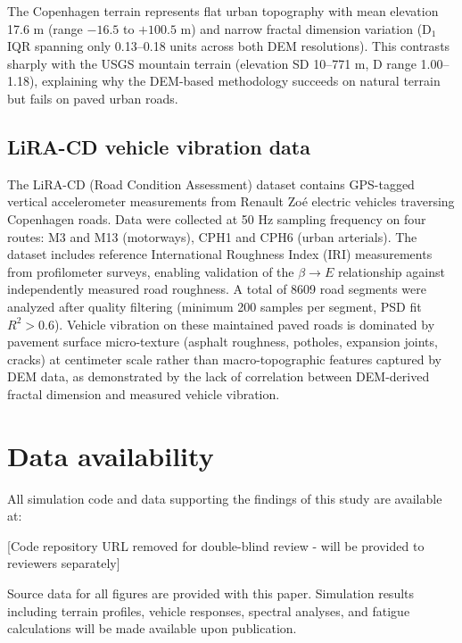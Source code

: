 \documentclass[11pt]{article}
\begin{document}
The Copenhagen terrain represents flat urban topography with mean elevation 17.6 m (range $-16.5$ to $+100.5$ m) and narrow fractal dimension variation (D$_1$ IQR spanning only 0.13--0.18 units across both DEM resolutions). This contrasts sharply with the USGS mountain terrain (elevation SD 10--771 m, D range 1.00--1.18), explaining why the DEM-based methodology succeeds on natural terrain but fails on paved urban roads.

\subsection*{LiRA-CD vehicle vibration data}

The LiRA-CD (Road Condition Assessment) dataset\cite{Skar2023} contains GPS-tagged vertical accelerometer measurements from Renault Zo\'{e} electric vehicles traversing Copenhagen roads. Data were collected at 50 Hz sampling frequency on four routes: M3 and M13 (motorways), CPH1 and CPH6 (urban arterials). The dataset includes reference International Roughness Index (IRI) measurements from profilometer surveys, enabling validation of the $\beta \rightarrow E$ relationship against independently measured road roughness. A total of 8609 road segments were analyzed after quality filtering (minimum 200 samples per segment, PSD fit $R^2 > 0.6$). Vehicle vibration on these maintained paved roads is dominated by pavement surface micro-texture (asphalt roughness, potholes, expansion joints, cracks) at centimeter scale rather than macro-topographic features captured by DEM data, as demonstrated by the lack of correlation between DEM-derived fractal dimension and measured vehicle vibration.


\section*{Data availability}

All simulation code and data supporting the findings of this study are available at:

\begin{center}
[Code repository URL removed for double-blind review - will be provided to reviewers separately]
\end{center}

Source data for all figures are provided with this paper. Simulation results including terrain profiles, vehicle responses, spectral analyses, and fatigue calculations will be made available upon publication. 
\end{document}

